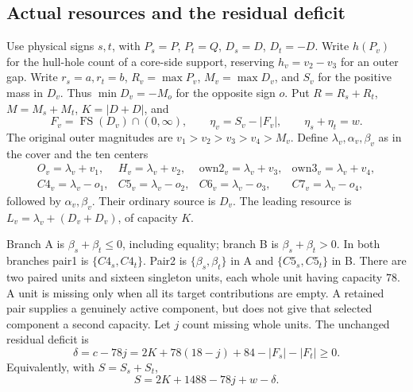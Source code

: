 \documentclass[11pt,letterpaper]{article}
\newcommand{\FS}{\operatorname{FS}}
\newcommand{\card}[1]{\lvert#1\rvert}
\theoremstyle{definition}\newtheorem{definition}[theorem]{Definition}
\begin{document}
\subsection{Actual resources and the residual deficit}
Use physical signs $s,t$, with $P_s=P$, $P_t=Q$, $D_s=D$, $D_t=-D$. Write $h(P_v)$ for
the hull-hole count of a core-side support, reserving $h_v=v_2-v_3$
for an outer gap. Write $r_s=a,r_t=b$,
$R_v=\max P_v$, $M_v=\max D_v$, and $S_v$ for the positive mass in
$D_v$. Thus $\min D_v=-M_o$ for the opposite sign $o$.
Put $R=R_s+R_t$, $M=M_s+M_t$, $K=\card{D+D}$, and
\[
F_v=\FS(D_v)\cap(0,\infty),\qquad
\eta_v=S_v-\card{F_v},\qquad\eta_s+\eta_t=w.
\]
The original outer magnitudes are $v_1>v_2>v_3>v_4>M_v$.
Define $\lambda_v,\alpha_v,\beta_v$ as in the cover and the ten centers
\[
\begin{array}{llll}
O_v=\lambda_v+v_1,&H_v=\lambda_v+v_2,&
\mathrm{own2}_v=\lambda_v+v_3,&\mathrm{own3}_v=\lambda_v+v_4,\\
C4_v=\lambda_v-o_1,&C5_v=\lambda_v-o_2,&
C6_v=\lambda_v-o_3,&C7_v=\lambda_v-o_4,
\end{array}
\]
followed by $\alpha_v,\beta_v$. Their ordinary source is $D_v$.
The leading resource is $L_v=\lambda_v+(D_v+D_v)$, of capacity $K$.

Branch A is $\beta_s+\beta_t\le0$, including equality; branch B is
$\beta_s+\beta_t>0$. In both branches pair1 is $\{C4_s,C4_t\}$.
Pair2 is $\{\beta_s,\beta_t\}$ in A and $\{C5_s,C5_t\}$ in B.
There are two paired units and sixteen singleton units, each whole unit
having capacity $78$. A unit is missing only when all its target
contributions are empty. A retained pair supplies a genuinely active
component, but does not give that selected component a second capacity.
Let $j$ count missing whole units. The unchanged residual deficit is
\begin{equation}\label{eq:common-delta}
\delta=c-78j
=2K+78(18-j)+84-\card{F_s}-\card{F_t}\ge0.
\end{equation}
Equivalently, with $S=S_s+S_t$,
\begin{equation}\label{eq:common-mass}
S=2K+1488-78j+w-\delta.
\end{equation}
\end{document}

